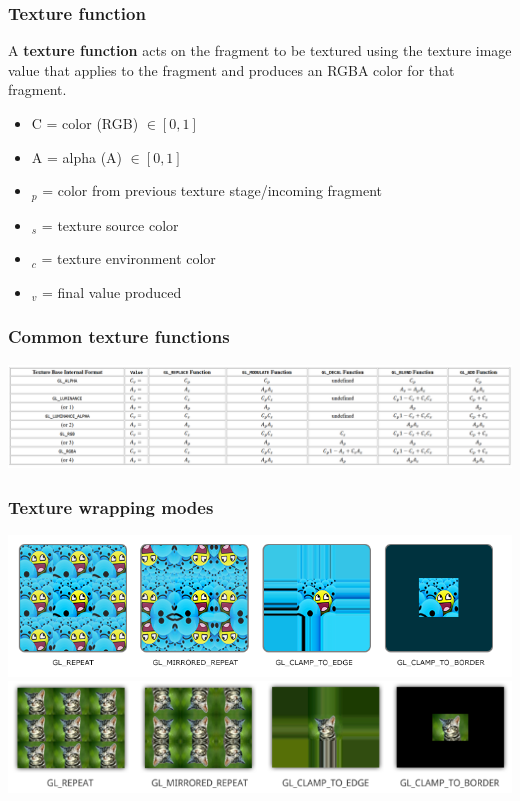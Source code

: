 \documentclass{beamer}
\begin{document}
\begin{frame}
    \frametitle{Texture function}

    A \textbf{texture function} acts on the fragment to be textured 
    using the texture image value that applies to the fragment 
    and produces an RGBA color for that fragment. 
    
    \begin{itemize}
        \item C = color (RGB) $\in [0,1]$
        \item A = alpha (A) $\in [0,1]$
        \item $_p$ = color from previous texture stage/incoming fragment
        \item $_s$ = texture source color
        \item $_c$ = texture environment color
        \item $_v$ = final value produced
    \end{itemize}

\end{frame}

\begin{frame}
    \frametitle{Common texture functions}

    \begin{center}
        \includegraphics[scale=0.5]{gl-tex-fn.png}
    \end{center}

\end{frame}

\begin{frame}
    \frametitle{Texture wrapping modes}

    \begin{center}
        \includegraphics[scale=0.4]{texture_wrapping.png}
        \includegraphics[scale=0.4]{texture_wrapping-1.png}
    \end{center}

\end{frame}
\end{document}
